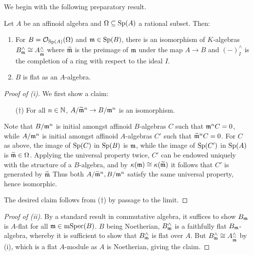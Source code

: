 We begin with the following preparatory result. 
\begin{proposition}\label{prop: flatness of section algebras}
    Let $A$ be an affinoid algebra and $\Omega\subseteq\mathrm{Sp}(A)$ a rational subset. Then:
    \begin{enumerate}[label=(\roman*)]
        \item For $B=\mathcal{O}_{\mathrm{Sp}(A)}(\Omega)$ and $\mathfrak{m}\in\mathrm{Sp}(B)$, there is an isomorphism of $K$-algebras $B_{\mathfrak{m}}^{\wedge}\cong A_{\widetilde{\mathfrak{m}}}^{\wedge}$ where $\widetilde{\mathfrak{m}}$ is the preimage of $\mathfrak{m}$ under the map $A\to B$ and $(-)^{\wedge}_{I}$ is the completion of a ring with respect to the ideal $I$. 
        \item $B$ is flat as an $A$-algebra. 
    \end{enumerate}
\end{proposition}
\begin{proof}[Proof of (i)]
    We first show a claim:
    \begin{itemize}
        \item [($\dagger$)] For all $n\in\mathbb{N}$, $A/\widetilde{\mathfrak{m}}^{n}\to B/\mathfrak{m}^{n}$ is an isomorphism. 
    \end{itemize}
    Note that $B/\mathfrak{m}^{n}$ is initial amongst affinoid $B$-algebras $C$ such that $\mathfrak{m}^{n}C=0$, while $A/\mathfrak{m}^{n}$ is initial amongst affinoid $A$-algebras $C'$ such that $\widetilde{\mathfrak{m}}^{n}C=0$. For $C$ as above, the image of $\mathrm{Sp}(C)$ in $\mathrm{Sp}(B)$ is $\mathfrak{m}$, while the image of $\mathrm{Sp}(C')$ in $\mathrm{Sp}(A)$ is $\widetilde{\mathfrak{m}}\in\Omega$. Applying the universal property twice, $C'$ can be endowed uniquely with the structure of a $B$-algebra, and by $\kappa(\mathfrak{m})\cong\kappa(\widetilde{\mathfrak{m}})$ it follows that $C'$ is generated by $\widetilde{\mathfrak{m}}$ Thus both $A/\widetilde{\mathfrak{m}}^{n}, B/\mathfrak{m}^{n}$ satisfy the same universal property, hence isomorphic. 

    The desired claim follows from ($\dagger$) by passage to the limit. 
\end{proof}
\begin{proof}[Proof of (ii)]
    By a standard result in commutative algebra, it suffices to show $B_{\mathfrak{m}}$ is $A$-flat for all $\mathfrak{m}\in\mathrm{mSpec}(B)$. $B$ being Noetherian, $B^{\wedge}_{\mathfrak{m}}$ is a faithfully flat $B_{\mathfrak{m}}$-algebra, whereby it is sufficient to show that $B^{\wedge}_{\mathfrak{m}}$ is flat over $A$. But $B^{\wedge}_{\mathfrak{m}}\cong A^{\wedge}_{\widetilde{\mathfrak{m}}}$ by (i), which is a flat $A$-module as $A$ is Noetherian, giving the claim. 
\end{proof}
